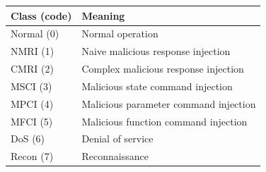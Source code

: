 \begin{tabular}{ll}
\toprule
Class (code) & Meaning \\
\midrule
Normal (0) & Normal operation \\
NMRI (1) & Naive malicious response injection \\
CMRI (2) & Complex malicious response injection \\
MSCI (3) & Malicious state command injection \\
MPCI (4) & Malicious parameter command injection \\
MFCI (5) & Malicious function command injection \\
DoS (6) & Denial of service \\
Recon (7) & Reconnaissance \\
\bottomrule
\end{tabular}
